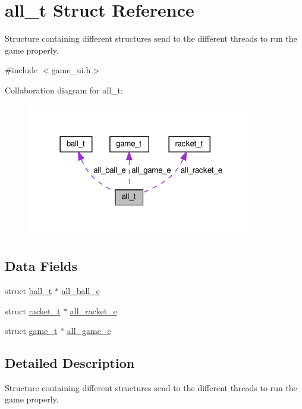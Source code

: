 \hypertarget{structall__t}{}\section{all\+\_\+t Struct Reference}
\label{structall__t}


Structure containing different structures send to the different threads to run the game properly.  




{\ttfamily \#include $<$game\+\_\+ui.\+h$>$}



Collaboration diagram for all\+\_\+t\+:\nopagebreak
\begin{figure}[H]
\begin{center}
\leavevmode
\includegraphics[width=285pt]{structall__t__coll__graph}
\end{center}
\end{figure}
\subsection*{Data Fields}
\begin{DoxyCompactItemize}
\item 
struct \hyperlink{structball__t}{ball\+\_\+t} $\ast$ \hyperlink{structall__t_a8d2313689132a052d5e697ed96c267b3}{all\+\_\+ball\+\_\+e}
\item 
struct \hyperlink{structracket__t}{racket\+\_\+t} $\ast$ \hyperlink{structall__t_a4857ea3a6650aa37b82c0e7336eaa278}{all\+\_\+racket\+\_\+e}
\item 
struct \hyperlink{structgame__t}{game\+\_\+t} $\ast$ \hyperlink{structall__t_af9c1a9096cf652aa5b37d4cc768dcd70}{all\+\_\+game\+\_\+e}
\end{DoxyCompactItemize}


\subsection{Detailed Description}
Structure containing different structures send to the different threads to run the game properly. 


